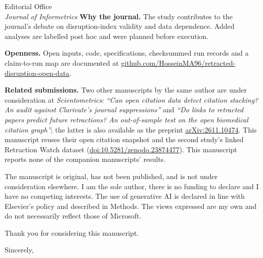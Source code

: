 \documentclass[10pt]{letter}
\begin{document}
\begin{letter}{Editorial Office\\\emph{Journal of Informetrics}}
\textbf{Why the journal.} The study contributes to the journal's debate on disruption-index validity and data
dependence. Added analyses are labelled post hoc and were planned before execution.

\textbf{Openness.} Open inputs, code, specifications, checksummed run records and a claim-to-run map are documented at
\mbox{\href{https://github.com/HosseinMA96/retracted-disruption-open-data}{github.com/HosseinMA96/retracted-disruption-open-data}}.

\textbf{Related submissions.} Two other manuscripts by the same author are under consideration at
\emph{Scientometrics}: \emph{``Can open citation data detect citation stacking? An audit against Clarivate's journal
suppressions''} and \emph{``Do links to retracted papers predict future retractions? An out-of-sample test on the
open biomedical citation graph''}; the latter is also available as the preprint
\href{https://arxiv.org/abs/2611.10474}{arXiv:2611.10474}. This manuscript reuses their open citation snapshot and the
second study's linked Retraction Watch dataset
(\href{https://doi.org/10.5281/zenodo.23874477}{doi:10.5281/zenodo.23874477}).
This manuscript reports none of the companion manuscripts' results.

The manuscript is original, has not been published, and is not under consideration elsewhere. I am the sole author,
there is no funding to declare and I have no competing interests. The use of generative AI is declared in line with
Elsevier's policy and described in Methods. The views expressed are my
own and do not necessarily reflect those of Microsoft.

Thank you for considering this manuscript.

\closing{Sincerely,}
\end{letter}
\end{document}
